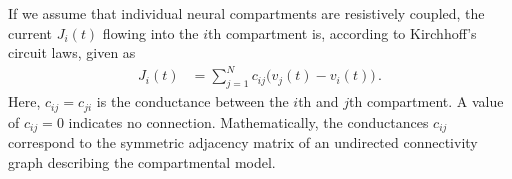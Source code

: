 If we assume that individual neural compartments are resistively coupled, the current $J_i(t)$ flowing into the $i$th compartment is, according to Kirchhoff's circuit laws, given as
\begin{align}
	J_i(t) &= \sum_{j = 1}^N c_{ij} \bigl(v_j(t) - v_i(t)\bigr) \,.
	\label{eqn:multi_comp_current}
\end{align}
Here, $c_{ij} = c_{ji}$ is the conductance between the $i$th and $j$th compartment. A value of $c_{ij} = 0$ indicates no connection.
Mathematically, the conductances $c_{ij}$ correspond to the symmetric adjacency matrix of an undirected connectivity graph describing the compartmental model.
